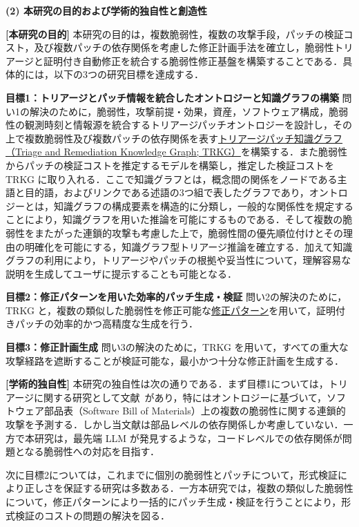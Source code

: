 \documentclass[11pt,a4j,dvipdfmx]{jarticle} 					%
\newcommand{\研究課題名}{大量の脆弱性・攻撃手段・パッチの依存関係を考慮した証明付き修正計画の自動生成}
\newcommand{\研究機関名}{電気通信大学}
\newcommand{\研究代表者氏名}{田原 康之}
\newcommand{\研究期間の最終元号年度}{12}  %
\begin{document}
\noindent\textbf{(2) 本研究の目的および学術的独自性と創造性}

\textbf{[本研究の目的]} 本研究の目的は，複数脆弱性，複数の攻撃手段，パッチの検証コスト，及び複数パッチの依存関係を考慮した修正計画手法を確立し，脆弱性トリアージと証明付き自動修正を統合する脆弱性修正基盤を構築することである．具体的には，以下の3つの研究目標を達成する．

\textbf{目標1：トリアージとパッチ情報を統合したオントロジーと知識グラフの構築} 問い1の解決のために，脆弱性，攻撃前提・効果，資産，ソフトウェア構成，脆弱性の観測時刻と情報源を統合するトリアージパッチオントロジーを設計し，その上で複数脆弱性及び複数パッチの依存関係を表す\ul{トリアージパッチ知識グラフ（Triage and Remediation Knowledge Graph; TRKG）}を構築する．また脆弱性からパッチの検証コストを推定するモデルを構築し，推定した検証コストを TRKG に取り入れる．ここで知識グラフとは，概念間の関係をノードである主語と目的語，およびリンクである述語の3つ組で表したグラフであり，オントロジーとは，知識グラフの構成要素を構造的に分類し，一般的な関係性を規定することにより，知識グラフを用いた推論を可能にするものである．そして複数の脆弱性をまたがった連鎖的攻撃も考慮した上で，脆弱性間の優先順位付けとその理由の明確化を可能にする，知識グラフ型トリアージ推論を確立する．加えて知識グラフの利用により，トリアージやパッチの根拠や妥当性について，理解容易な説明を生成してユーザに提示することも可能となる．

\textbf{目標2：修正パターンを用いた効率的パッチ生成・検証} 問い2の解決のために，TRKG と，複数の類似した脆弱性を修正可能な\ul{修正パターン}を用いて，証明付きパッチの効率的かつ高精度な生成を行う．

\textbf{目標3：修正計画生成} 問い3の解決のために，TRKG を用いて，すべての重大な攻撃経路を遮断することが検証可能な，最小かつ十分な修正計画を生成する．

\textbf{[学術的独自性]} 本研究の独自性は次の通りである．まず目標1については，トリアージに関する研究として文献~\cite{10.1145/3803437.3805583,11097865}があり，特に\cite{10.1145/3803437.3805583}はオントロジーに基づいて，ソフトウェア部品表（Software Bill of Materials）上の複数の脆弱性に関する連鎖的攻撃を予測する．しかし当文献は部品レベルの依存関係しか考慮していない．一方で本研究は，最先端 LLM が発見するような，コードレベルでの依存関係が問題となる脆弱性への対応を目指す．

次に目標2については，これまでに個別の脆弱性とパッチについて，形式検証により正しさを保証する研究は多数ある．一方本研究では，複数の類似した脆弱性について，修正パターンにより一括的にパッチ生成・検証を行うことにより，形式検証のコストの問題の解決を図る．
\end{document}
